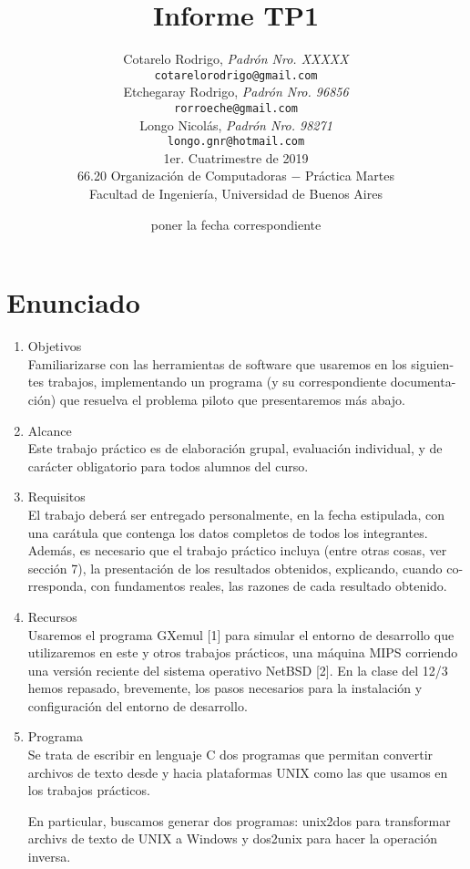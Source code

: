 \documentclass[a4paper,11pt]{article}
\title{		\textbf{Informe TP1}}
\author{	Cotarelo Rodrigo, \textit{Padrón Nro. XXXXX}                     \\
            \texttt{ cotarelorodrigo@gmail.com }                                              \\[2.5ex]
            Etchegaray Rodrigo, \textit{Padrón Nro. 96856}                     \\
            \texttt{ rorroeche@gmail.com }                                              \\[2.5ex]
			Longo Nicolás, \textit{Padrón Nro. 98271}                    
\\
            \texttt{ longo.gnr@hotmail.com }                                              \\[2.5ex]
            \normalsize{1er. Cuatrimestre de 2019}                                      \\
            \normalsize{66.20 Organización de Computadoras  $-$ Práctica Martes}  \\
            \normalsize{Facultad de Ingeniería, Universidad de Buenos Aires}            \\
       }
\date{poner la fecha correspondiente}
\begin{document}
\maketitle
\thispagestyle{empty}   %
\newpage

\section{Enunciado}

\begin{enumerate}
\item Objetivos \\
Familiarizarse con las herramientas de software que usaremos en los siguien-
tes trabajos, implementando un programa (y su correspondiente documenta-
ción) que resuelva el problema piloto que presentaremos más abajo.

\item Alcance \\
Este trabajo práctico es de elaboración grupal, evaluación individual, y de
carácter obligatorio para todos alumnos del curso.

\item Requisitos \\
El trabajo deberá ser entregado personalmente, en la fecha estipulada, con
una carátula que contenga los datos completos de todos los integrantes.
Además, es necesario que el trabajo práctico incluya (entre otras cosas, ver
sección 7), la presentación de los resultados obtenidos, explicando, cuando co-
rresponda, con fundamentos reales, las razones de cada resultado obtenido.

\item Recursos \\
Usaremos el programa GXemul [1] para simular el entorno de desarrollo que
utilizaremos en este y otros trabajos prácticos, una máquina MIPS corriendo
una versión reciente del sistema operativo NetBSD [2].
En la clase del 12/3 hemos repasado, brevemente, los pasos necesarios para
la instalación y configuración del entorno de desarrollo.

\item Programa \\
Se trata de escribir en lenguaje C dos programas que permitan convertir
archivos de texto desde y hacia plataformas UNIX como las que usamos en los
trabajos prácticos. 


\indent
En particular, buscamos generar dos programas: unix2dos para transformar archivs de texto de UNIX a Windows y dos2unix para hacer la operación inversa.



\end{enumerate}
\end{document}
